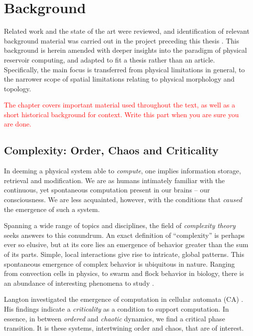 \chapter{Background}


Related work and the state of the art were reviewed, and identification of
relevant background material was carried out in the project preceding this
thesis \cite{aven_exploring_2019}. This background is herein amended with deeper
insights into the paradigm of physical reservoir computing, and adapted to fit a
thesis rather than an article. Specifically, the main focus is transferred from
physical limitations in general, to the narrower scope of spatial limitations
relating to physical morphology and topology.

\textcolor{red}{
  The chapter covers important material used throughout the text, as well as a
short historical background for context. Write this part when you are sure you
are done.
}

\section{Complexity: Order, Chaos and Criticality}
\label{sec:criticality}

In deeming a physical system able to \textit{compute}, one implies information
storage, retrieval and modification. We are as humans intimately familiar with
the continuous, yet spontaneous computation present in our brains -- our
consciousness. We are less acquainted, however, with the conditions that
\textit{caused} the emergence of such a system.

Spanning a wide range of topics and disciplines, the field of \textit{complexity
theory} seeks answers to this conundrum. An exact definition of ``complexity''
is perhaps ever so elusive, but at its core lies an emergence of behavior
greater than the sum of its parts. Simple, local interactions give rise to
intricate, global patterns. This spontaneous emergence of complex behavior is
ubiquitous in nature. Ranging from convection cells in physics, to swarm and
flock behavior in biology, there is an abundance of interesting phenomena to
study \cite{heylighen_science_1999-1}.

Langton investigated the emergence of computation in cellular automata (CA)
\cite{langton_computation_1990}. His findings indicate a \textit{criticality} as
a condition to support computation. In essence, in between \textit{ordered} and
\textit{chaotic} dynamics, we find a critical phase transition. It is these
systems, intertwining order and chaos, that are of interest.

